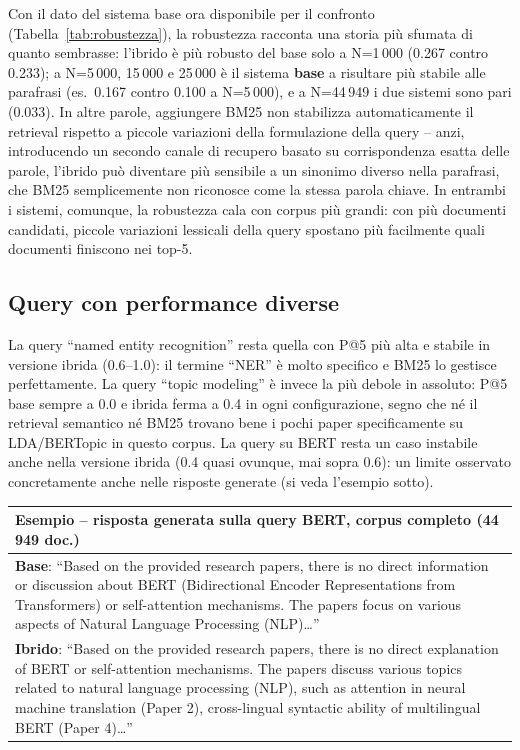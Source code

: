 \documentclass[12pt,a4paper]{article}
\begin{document}
Con il dato del sistema base ora disponibile per il confronto (Tabella~\ref{tab:robustezza}), la robustezza racconta una storia pi\`u sfumata di quanto sembrasse: l'ibrido \`e pi\`u robusto del base solo a N=1\,000 (0.267 contro 0.233); a N=5\,000, 15\,000 e 25\,000 \`e il sistema \textbf{base} a risultare pi\`u stabile alle parafrasi (es.\ 0.167 contro 0.100 a N=5\,000), e a N=44\,949 i due sistemi sono pari (0.033). In altre parole, aggiungere BM25 non stabilizza automaticamente il retrieval rispetto a piccole variazioni della formulazione della query -- anzi, introducendo un secondo canale di recupero basato su corrispondenza esatta delle parole, l'ibrido pu\`o diventare pi\`u sensibile a un sinonimo diverso nella parafrasi, che BM25 semplicemente non riconosce come la stessa parola chiave. In entrambi i sistemi, comunque, la robustezza cala con corpus pi\`u grandi: con pi\`u documenti candidati, piccole variazioni lessicali della query spostano pi\`u facilmente quali documenti finiscono nei top-5.

\subsection{Query con performance diverse}

La query ``named entity recognition'' resta quella con P@5 pi\`u alta e stabile in versione ibrida (0.6--1.0): il termine ``NER'' \`e molto specifico e BM25 lo gestisce perfettamente. La query ``topic modeling'' \`e invece la pi\`u debole in assoluto: P@5 base sempre a 0.0 e ibrida ferma a 0.4 in ogni configurazione, segno che n\'e il retrieval semantico n\'e BM25 trovano bene i pochi paper specificamente su LDA/BERTopic in questo corpus. La query su BERT resta un caso instabile anche nella versione ibrida (0.4 quasi ovunque, mai sopra 0.6): un limite osservato concretamente anche nelle risposte generate (si veda l'esempio sotto).

\begin{table}[H]
\centering
\begin{tabular}{p{14.5cm}}
\toprule
\textbf{Esempio -- risposta generata sulla query BERT, corpus completo (44\,949 doc.)} \\
\midrule
\textbf{Base}: ``Based on the provided research papers, there is no direct information or discussion about BERT (Bidirectional Encoder Representations from Transformers) or self-attention mechanisms. The papers focus on various aspects of Natural Language Processing (NLP)\ldots'' \\[0.5em]
\textbf{Ibrido}: ``Based on the provided research papers, there is no direct explanation of BERT or self-attention mechanisms. The papers discuss various topics related to natural language processing (NLP), such as attention in neural machine translation (Paper 2), cross-lingual syntactic ability of multilingual BERT (Paper 4)\ldots'' \\
\bottomrule
\end{tabular}
\end{table}
\end{document}

